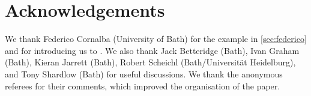 \section*{Acknowledgements}
We thank Federico Cornalba (University of Bath) for the example in \cref{sec:federico} and for introducing us to \cite{Si:86}. We also thank Jack Betteridge (Bath), Ivan Graham (Bath),  Kieran Jarrett (Bath), Robert Scheichl (Bath/Universit\"at Heidelburg), and Tony Shardlow (Bath) for useful discussions. We thank the anonymous referees for their comments, which improved the organisation of the paper.